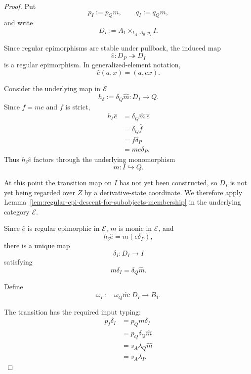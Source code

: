 \begin{proof}
    Put
    \[
        p_I:=p_Qm,
        \qquad
        q_I:=q_Qm,
    \]
    and write
    \[
        D_I
        :=
        A_1\times_{t_A,A_0,p_I}I.
    \]

    Since regular epimorphisms are stable under pullback, the induced map
    \[
        \widehat e:D_P\twoheadrightarrow D_I
    \]
    is a regular epimorphism. In generalized-element notation,
    \[
        \widehat e(a,x)=(a,ex).
    \]

    Consider the underlying map in \(\mathcal E\)
    \[
        h_\delta
        :=
        \delta_Q\widehat m:
        D_I\to Q.
    \]
    Since \(f=me\) and \(f\) is strict,
    \[
    \begin{aligned}
        h_\delta\widehat e
        &=
        \delta_Q\widehat m\,\widehat e
        \\
        &=
        \delta_Q\widehat f
        \\
        &=
        f\delta_P
        \\
        &=
        me\delta_P.
    \end{aligned}
    \]
    Thus \(h_\delta\widehat e\) factors through the underlying monomorphism
    \[
        m:I\hookrightarrow Q.
    \]

    At this point the transition map on \(I\) has not yet been constructed,
    so \(D_I\) is not yet being regarded over \(Z\) by a derivative-state
    coordinate. We therefore apply
    Lemma~\ref{lem:regular-epi-descent-for-subobjects-membership}
    in the underlying category \(\mathcal E\).

    Since \(\widehat e\) is regular epimorphic in \(\mathcal E\), \(m\) is
    monic in \(\mathcal E\), and
    \[
        h_\delta\widehat e
        =
        m(e\delta_P),
    \]
    there is a unique map
    \[
        \delta_I:D_I\to I
    \]
    satisfying
    \[
        m\delta_I
        =
        \delta_Q\widehat m.
    \]

    Define
    \[
        \omega_I
        :=
        \omega_Q\widehat m:
        D_I\to B_1.
    \]

    The transition has the required input typing:
    \[
    \begin{aligned}
        p_I\delta_I
        &=
        p_Qm\delta_I
        \\
        &=
        p_Q\delta_Q\widehat m
        \\
        &=
        s_A\lambda_Q\widehat m
        \\
        &=
        s_A\lambda_I.
    \end{aligned}
    \]


\end{proof}
